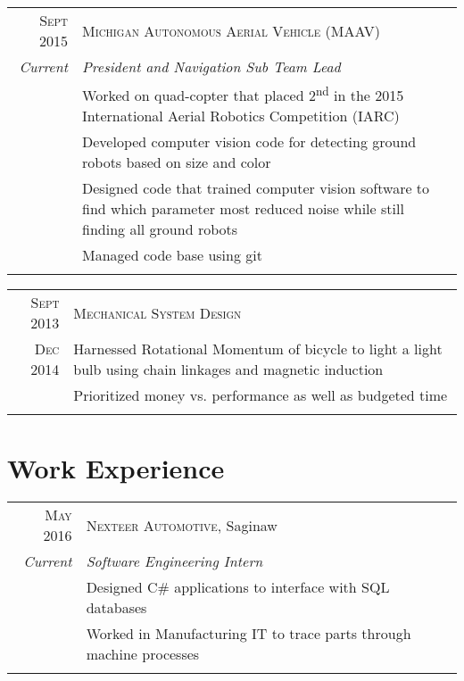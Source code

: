 \documentclass[a4paper,10pt]{article} %
\begin{document}
\begin{tabular}{r|p{13cm}}
\textsc{Sept 2015} & \textsc{Michigan Autonomous Aerial Vehicle (MAAV)} \\
\emph{Current} & \emph{President and Navigation Sub Team Lead} \\
& \footnotesize{Worked on quad-copter that placed 2\textsuperscript{nd} in the
  2015 International Aerial Robotics Competition (IARC)} \\
& \footnotesize{Developed computer vision code for detecting ground robots based
  on size and color} \\
& \footnotesize{Designed code that trained computer vision software to find
  which parameter most reduced noise while still finding all ground robots} \\
& \footnotesize{Managed code base using git} \\
\multicolumn{2}{c}{} \\
\end{tabular}


\begin{tabular}{r|p{13cm}}
\textsc{Sept 2013} & \textsc{Mechanical System Design} \\
\textsc{Dec 2014} & \footnotesize{Harnessed Rotational Momentum of bicycle to
  light a light bulb using chain linkages and magnetic induction} \\
& \footnotesize{Prioritized money vs. performance as well as budgeted time} \\
\multicolumn{2}{c}{} \\
\end{tabular}


\section{Work Experience}

\begin{tabular}{r|p{13cm}}
\textsc{May 2016} & \textsc{Nexteer Automotive}, Saginaw \\
\emph{Current} & \emph{Software Engineering Intern} \\
& \footnotesize{Designed C\# applications to interface with SQL databases} \\
& \footnotesize{Worked in Manufacturing IT to trace parts through machine processes} \\
\multicolumn{2}{c}{} \\
\end{tabular}
\end{document}

